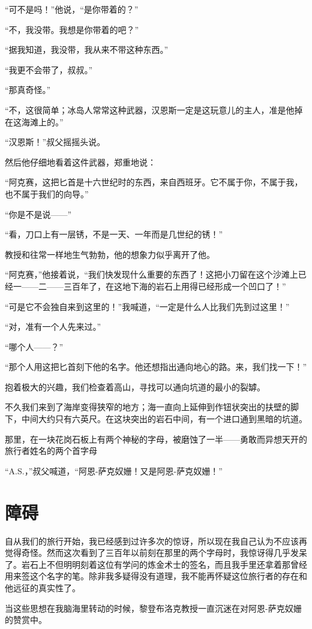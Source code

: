 \documentclass[10pt]{book}
\begin{document}
“可不是吗！”他说，“是你带着的？”

“不，我没带。我想是你带着的吧？”

“据我知道，我没带，我从来不带这种东西。”

“我更不会带了，叔叔。”

“那真奇怪。”

“不，这很简单；冰岛人常常这种武器，汉恩斯一定是这玩意儿的主人，准是他掉在这海滩上的。”

“汉恩斯！”叔父摇摇头说。

然后他仔细地看着这件武器，郑重地说：

“阿克赛，这把匕首是十六世纪时的东西，来自西班牙。它不属于你，不属于我，也不属于我们的向导。”

“你是不是说——”

“看，刀口上有一层锈，不是一天、一年而是几世纪的锈！”

教授和往常一样地生气勃勃，他的想象力似乎离开了他。

“阿克赛，”他接着说，“我们快发现什么重要的东西了！这把小刀留在这个沙滩上已经一——二——三百年了，在这地下海的岩石上用得已经形成一个凹口了！”

“可是它不会独自来到这里的！”我喊道，“一定是什么人比我们先到过这里！”

“对，准有一个人先来过。”

“哪个人——？”

“那个人用这把匕首刻下他的名字。他还想指出通向地心的路。来，我们找一下！”

抱着极大的兴趣，我们检查着高山，寻找可以通向坑道的最小的裂罅。

不久我们来到了海岸变得狭窄的地方；海一直向上延伸到作钮状突出的扶壁的脚下，中间大约只有六英尺。在这块突出的岩石中间，有一个进口通到黑暗的坑道。

那里，在一块花岗石板上有两个神秘的字母，被磨蚀了一半——勇敢而异想天开的旅行者姓名的两个首字母

“A.S.，”叔父喊道，“阿恩-萨克奴姗！又是阿恩-萨克奴姗！”
\chapter{障碍}
自从我们的旅行开始，我已经感到过许多次的惊讶，所以现在我自己认为不应该再觉得奇怪。然而这次看到了三百年以前刻在那里的两个字母时，我惊讶得几乎发呆了。岩石上不但明明刻着这位有学问的炼金术士的签名，而且我手里还拿着那曾经用来签这个名字的笔。除非我多疑得没有道理，我不能再怀疑这位旅行者的存在和他远征的真实性了。

当这些思想在我脑海里转动的时候，黎登布洛克教授一直沉迷在对阿恩-萨克奴姗的赞赏中。
\end{document}
